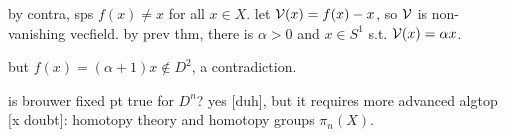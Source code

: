 \begin{pf}[source=Primary Source Material]
    by contra, sps $f(x)\neq x$ for all $x\in X$.
    let $\mathcal{V}(x)=f(x)-x$, so $\mathcal{V}$ is non-vanishing vecfield.
    by prev thm, there is $\alpha>0$ and $x\in S^{1}$ s.t. $\mathcal{V}(x)=\alpha x$.

    but $f(x)=(\alpha+1)x\notin D^{2}$, a contradiction.
\end{pf}
is brouwer fixed pt true for $D^{n}$?
yes [duh], but it requires more advanced algtop [x doubt]:
homotopy theory and homotopy groups $\pi_{n}(X)$.




